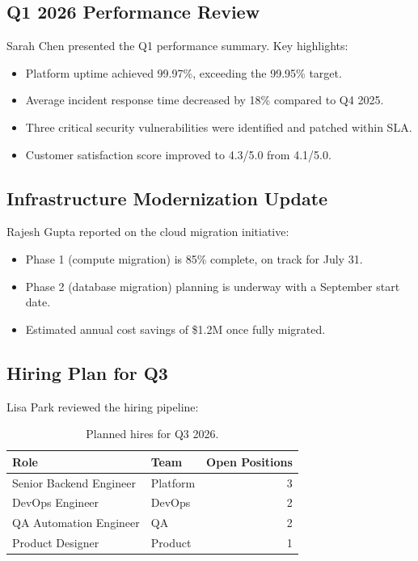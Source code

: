 \documentclass[
    language=english,
    doctype=memo,
    institution=none,
]{../../omnilatex}
\begin{document}
\subsection{Q1 2026 Performance Review}

Sarah Chen presented the Q1 performance summary. Key highlights:

\begin{itemize}
    \item Platform uptime achieved 99.97\%, exceeding the 99.95\% target.
    \item Average incident response time decreased by 18\% compared to Q4 2025.
    \item Three critical security vulnerabilities were identified and patched
          within SLA.
    \item Customer satisfaction score improved to 4.3/5.0 from 4.1/5.0.
\end{itemize}

\subsection{Infrastructure Modernization Update}

Rajesh Gupta reported on the cloud migration initiative:

\begin{itemize}
    \item Phase 1 (compute migration) is 85\% complete, on track for July 31.
    \item Phase 2 (database migration) planning is underway with a September
          start date.
    \item Estimated annual cost savings of \$1.2M once fully migrated.
\end{itemize}

\subsection{Hiring Plan for Q3}

Lisa Park reviewed the hiring pipeline:

\begin{table}[h]
    \centering
    \begin{tabular}{llr}
        \toprule
        \textbf{Role} & \textbf{Team} & \textbf{Open Positions} \\
        \midrule
        Senior Backend Engineer  & Platform    & 3 \\
        DevOps Engineer          & DevOps      & 2 \\
        QA Automation Engineer   & QA          & 2 \\
        Product Designer         & Product     & 1 \\
        \bottomrule
    \end{tabular}
    \caption{Planned hires for Q3 2026.}
\end{table}
\end{document}
